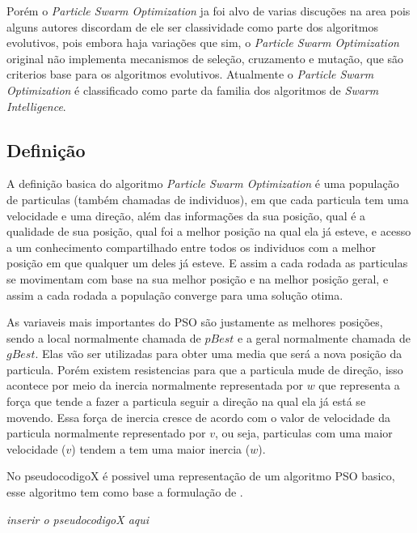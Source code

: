         Porém o \textit{Particle Swarm Optimization} ja foi alvo de varias discuções na area pois alguns autores discordam de ele ser classividade como parte dos algoritmos evolutivos, pois embora haja variações que sim, o \textit{Particle Swarm Optimization} original não implementa mecanismos de seleção, cruzamento e mutação, que são criterios base para os algoritmos evolutivos. \newline
        Atualmente o \textit{Particle Swarm Optimization} é classificado como parte da familia dos algoritmos de \textit{Swarm Intelligence}.


    \subsection{Definição}
        A definição basica do algoritmo \textit{Particle Swarm Optimization} é uma população de particulas (também chamadas de individuos), em que cada particula tem uma velocidade e uma direção, além das informações da sua posição, qual é a qualidade de sua posição, qual foi a melhor posição na qual ela já esteve, e acesso a um conhecimento compartilhado entre todos os individuos com a melhor posição em que qualquer um deles já esteve. E assim a cada rodada as particulas se movimentam com base na sua melhor posição e na melhor posição geral, e assim a cada rodada a população converge para uma solução otima.\newline
        
        As variaveis mais importantes do PSO são justamente as melhores posições, sendo a local normalmente chamada de $pBest$ e a geral normalmente chamada de $gBest$. Elas vão ser utilizadas para obter uma media que será a nova posição da particula. Porém existem resistencias para que a particula mude de direção, isso acontece por meio da inercia normalmente representada por $w$ que representa a força que tende a fazer a particula seguir a direção na qual ela já está se movendo. Essa força de inercia cresce de acordo com o valor de velocidade da particula normalmente representado por $v$, ou seja, particulas com uma maior velocidade ($v$) tendem a tem uma maior inercia ($w$).\newline
        
        No pseudocodigoX é possivel uma representação de um algoritmo PSO basico, esse algoritmo tem como base a formulação de \cite{martinez2009}.
        
        \textit{inserir o pseudocodigoX aqui}

